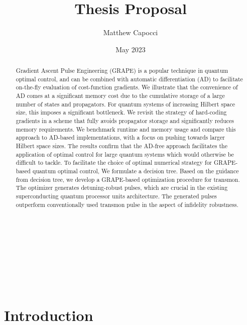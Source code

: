 \documentclass[12pt]{article}
\title{Thesis Proposal}
\author{Matthew Capocci}
\date{May 2023}
\begin{document}
\\[0.1in]
\\[0.5in]
\\[1.5in]
\\[1.5in]
\\[1in]

\newpage

\begin{abstract}
Gradient Ascent Pulse Engineering (GRAPE) is a popular technique in quantum optimal control, and can be combined
with automatic differentiation (AD) to facilitate on-the-fly evaluation of cost-function gradients. We illustrate that the
convenience of AD comes at a significant memory cost due to the cumulative storage of a large number of states and
propagators. For quantum systems of increasing Hilbert space size, this imposes a significant bottleneck. We revisit the
strategy of hard-coding gradients in a scheme that fully avoids propagator storage and significantly reduces memory
requirements. 
We benchmark runtime and memory usage and compare this approach to AD-based implementations, with a focus on
pushing towards larger Hilbert space sizes. The results confirm that the AD-free approach facilitates the application of optimal control for large quantum systems which would otherwise be difficult to tackle. To facilitate the choice of optimal numerical strategy for GRAPE-based quantum optimal control, We formulate a decision tree. Based on the guidance from decision tree, we develop a GRAPE-based optimization procedure for transmon. The optimizer generates detuning-robust pulses, which are crucial in the existing superconducting quantum processor units architecture. The generated pulses outperform conventionally used transmon pulse in the aspect of infidelity robustness. 

\end{abstract}

\newpage
\tableofcontents

\justify
\doublespacing

\newpage
\section{Introduction}
\end{document}
